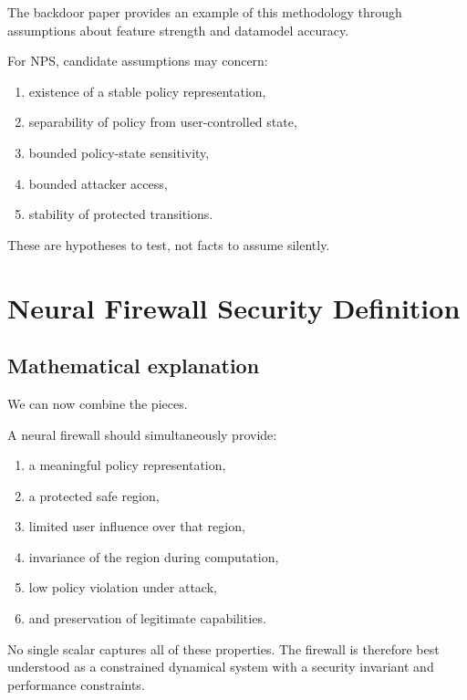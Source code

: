 \documentclass[11pt]{article}
\begin{document}
The backdoor paper provides an example of this methodology through assumptions
about feature strength and datamodel accuracy. \cite{backdoor}

For NPS, candidate assumptions may concern:

\begin{enumerate}
    \item existence of a stable policy representation,
    \item separability of policy from user-controlled state,
    \item bounded policy-state sensitivity,
    \item bounded attacker access,
    \item stability of protected transitions.
\end{enumerate}

These are hypotheses to test, not facts to assume silently.

\section{Neural Firewall Security Definition}

\subsection*{Mathematical explanation}

We can now combine the pieces.

A neural firewall should simultaneously provide:

\begin{enumerate}
    \item a meaningful policy representation,
    \item a protected safe region,
    \item limited user influence over that region,
    \item invariance of the region during computation,
    \item low policy violation under attack,
    \item and preservation of legitimate capabilities.
\end{enumerate}

No single scalar captures all of these properties. The firewall is therefore
best understood as a constrained dynamical system with a security invariant
and performance constraints.
\end{document}
